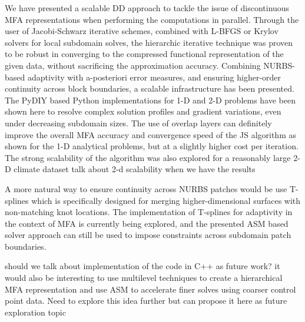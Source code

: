 \documentclass[conference]{IEEEtran}
\begin{document}
We have presented a scalable DD approach to tackle the issue of discontinuous MFA representations when performing the computations in parallel. Through the user of Jacobi-Schwarz iterative schemes, combined with L-BFGS or Krylov solvers for local subdomain solves, the hierarchic iterative technique was proven to be robust in converging to the compressed functional representation of the given data, without sacrificing the approximation accuracy. Combining NURBS-based adaptivity with a-posteriori error measures, and ensuring higher-order continuity across block boundaries, a scalable infrastructure has been presented. The PyDIY based Python implementations for 1-D and 2-D problems have been shown here to resolve complex solution profiles and gradient variations, even under decreasing subdomain sizes. The use of overlap layers can definitely improve the overall MFA accuracy and convergence speed of the JS algorithm as shown for the 1-D analytical problems, but at a slightly higher cost per iteration. The strong scalability of the algorithm was also explored for a reasonably large 2-D climate dataset {\color{red} talk about 2-d scalability when we have the results}

A more natural way to ensure continuity across NURBS patches would be use T-splines which is specifically designed for merging higher-dimensional surfaces with non-matching knot locations. The implementation of T-splines for adaptivity in the context of MFA is currently being explored, and the presented ASM based solver approach can still be used to impose constraints across subdomain patch boundaries. 

{\color{red} 
	should we talk about implementation of the code in C++ as future work?
	it would also be interesting to use multilevel techniques to create a hierarchical MFA representation and use ASM to accelerate finer solves using coarser control point data. Need to explore this idea further but can propose it here as future exploration topic
}

\end{document}
